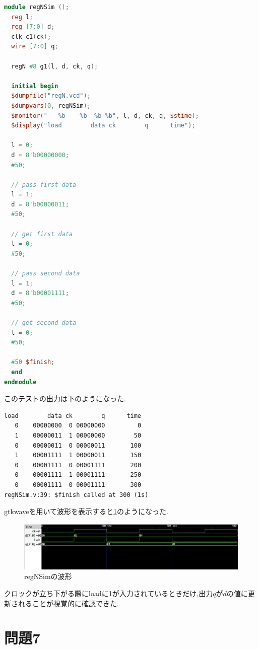 \documentclass[autodetect-engine, dvi=dvipdfmx, 10pt, a4paper, ja=standard]{bxjsarticle}
\begin{document}
\begin{lstlisting}[language={Verilog}, caption={モジュールregNSimのVerilogコード}, label={code:mod-regn}]
  module regNSim ();
  reg l;
  reg [7:0] d;
  clk c1(ck);
  wire [7:0] q;

  regN #8 g1(l, d, ck, q);

  initial begin
  $dumpfile("regN.vcd");
  $dumpvars(0, regNSim);
  $monitor("   %b    %b  %b %b", l, d, ck, q, $stime);
  $display("load        data ck        q      time");

  l = 0;
  d = 8'b00000000;
  #50;

  // pass first data
  l = 1;
  d = 8'b00000011;
  #50;

  // get first data
  l = 0;
  #50;

  // pass second data
  l = 1;
  d = 8'b00001111;
  #50;

  // get second data
  l = 0;
  #50;

  #50 $finish;
  end
endmodule
\end{lstlisting}

このテストの出力は下のようになった.

\begin{verbatim}
load        data ck        q      time
   0    00000000  0 00000000         0
   1    00000011  1 00000000        50
   0    00000011  0 00000011       100
   1    00001111  1 00000011       150
   0    00001111  0 00001111       200
   0    00001111  1 00001111       250
   0    00001111  0 00001111       300
regNSim.v:39: $finish called at 300 (1s)
\end{verbatim}

gtkwaveを用いて波形を表示すると\ref{fig:ex6-wave}のようになった.

\begin{figure}[H]
	\centering
	\includegraphics[width=\textwidth]{ex6-wave.png}
	\caption{regNSimの波形}
	\label{fig:ex6-wave}
\end{figure}

クロックが立ち下がる際にloadに1が入力されているときだけ,出力$q$が$d$の値に更新されることが視覚的に確認できた.

\section{問題7}
\end{document}
